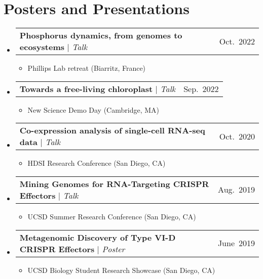\documentclass[letterpaper,11pt]{article}
\makeatletter
\newcommand{\resumeItem}[1]{
  \item\small{
    {#1 \vspace{-2pt}}
  }
}
\newcommand{\resumeProjectHeading}[2]{
    \item
    \begin{tabular*}{0.97\textwidth}{l@{\extracolsep{\fill}}r}
      \small#1 & #2 \\
    \end{tabular*}\vspace{-7pt}
}
\newcommand{\resumeSubHeadingListStart}{\begin{itemize}[leftmargin=0.15in, label={}]}
\newcommand{\resumeSubHeadingListEnd}{\end{itemize}}
\newcommand{\resumeItemListStart}{\begin{itemize}}
\newcommand{\resumeItemListEnd}{\end{itemize}\vspace{-5pt}}
\makeatother
\begin{document}
\section{Posters and Presentations}
    \resumeSubHeadingListStart
      \resumeProjectHeading
          {\textbf{Phosphorus dynamics, from genomes to ecosystems} $|$ \emph{Talk}}{Oct.\ 2022}
          \resumeItemListStart
            \resumeItem{Phillips Lab retreat (Biarritz, France)}
          \resumeItemListEnd
      \resumeProjectHeading
          {\textbf{Towards a free-living chloroplast} $|$ \emph{Talk}}{Sep.\ 2022}
          \resumeItemListStart
            \resumeItem{New Science Demo Day (Cambridge, MA)}
          \resumeItemListEnd
      \resumeProjectHeading
          {\textbf{Co-expression analysis of single-cell RNA-seq data} $|$ \emph{Talk}}{Oct.\ 2020}
          \resumeItemListStart
            \resumeItem{HDSI Research Conference (San Diego, CA)}
          \resumeItemListEnd
      \resumeProjectHeading
          {\textbf{Mining Genomes for RNA-Targeting CRISPR Effectors} $|$ \emph{Talk}}{Aug.\ 2019}
          \resumeItemListStart
            \resumeItem{UCSD Summer Research Conference (San Diego, CA)}
          \resumeItemListEnd
      \resumeProjectHeading
          {\textbf{Metagenomic Discovery of Type VI-D CRISPR Effectors} $|$ \emph{Poster}}{June\ 2019}
          \resumeItemListStart
            \resumeItem{UCSD Biology Student Research Showcase (San Diego, CA)}
          \resumeItemListEnd
    \resumeSubHeadingListEnd

\end{document}
